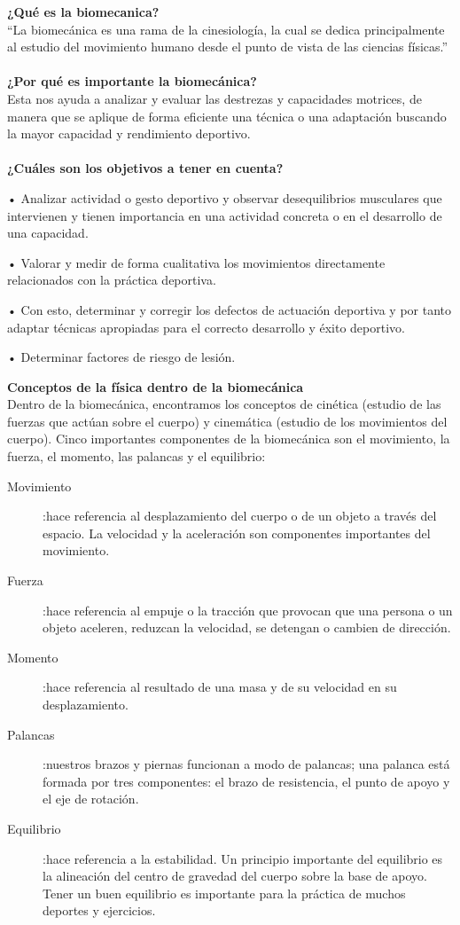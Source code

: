 \documentclass{article}
\begin{document}
\cite{ff4}\textbf{¿Qué es la biomecanica?} \\
“La biomecánica es una rama de la cinesiología, la cual se dedica principalmente al estudio del movimiento humano desde el punto de vista de las ciencias físicas.” \\ \\
\textbf{¿Por qué es importante la biomecánica?} \\
Esta nos ayuda a analizar y evaluar las destrezas y capacidades motrices, de manera que se aplique de forma eficiente una técnica o una adaptación buscando la mayor capacidad y rendimiento deportivo. \\ \\
\textbf{¿Cuáles son los objetivos a tener en cuenta?}
\begin{description}
\item •	Analizar actividad o gesto deportivo y observar desequilibrios musculares que intervienen y tienen importancia en una actividad concreta o en el desarrollo de una capacidad.
\item •	Valorar y medir de forma cualitativa los movimientos directamente relacionados con la práctica deportiva.
\item •	Con esto, determinar y corregir los defectos de actuación deportiva y por tanto adaptar técnicas apropiadas para el correcto desarrollo y éxito deportivo.
\item •	Determinar factores de riesgo de lesión. 
\end{description}
\textbf{Conceptos de la física dentro de la biomecánica} \\
Dentro de la biomecánica, encontramos los conceptos de cinética (estudio de las fuerzas que actúan sobre el cuerpo) y cinemática (estudio de los movimientos del cuerpo). Cinco importantes componentes de la biomecánica son el movimiento, la fuerza, el momento, las palancas y el equilibrio: 
\begin{description}
\item[Movimiento]:hace referencia al desplazamiento del cuerpo o de un objeto a través del espacio. La velocidad y la aceleración son componentes importantes del movimiento.
\item[Fuerza]:hace referencia al empuje o la tracción que provocan que una persona o un objeto aceleren, reduzcan la velocidad, se detengan o cambien de dirección.
\item[Momento]:hace referencia al resultado de una masa y de su velocidad en su desplazamiento.
\item[Palancas]:nuestros brazos y piernas funcionan a modo de palancas; una palanca está formada por tres componentes: el brazo de resistencia, el punto de apoyo y el eje de rotación.
\item[Equilibrio]:hace referencia a la estabilidad. Un principio importante del equilibrio es la alineación del centro de gravedad del cuerpo sobre la base de apoyo. Tener un buen equilibrio es importante para la práctica de muchos deportes y ejercicios.
\end{description} 
\end{document}
